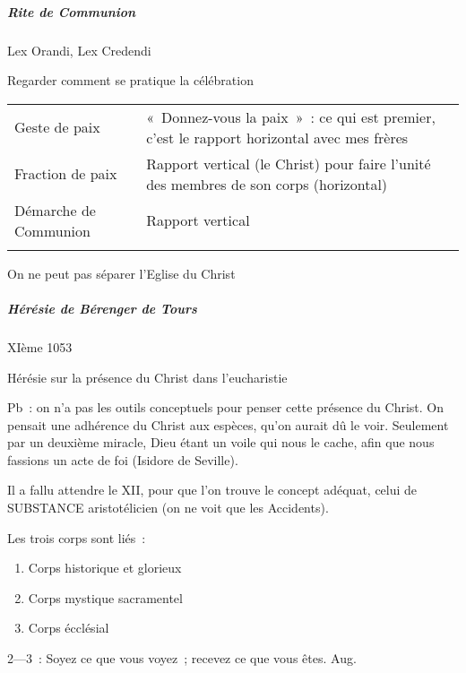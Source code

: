 \hypertarget{rite-de-communion}{%
\subparagraph{Rite de Communion}\label{rite-de-communion}}

Lex Orandi, Lex Credendi

Regarder comment se pratique la célébration

\begin{table}[h!]
    \centering
      \sidecaption{ }
 
\begin{tabular}{p{}p{}}
\toprule
Geste de paix & «~Donnez-vous la paix~»~: ce qui est premier, c'est le
rapport horizontal avec mes frères \\
Fraction de paix & Rapport vertical (le Christ) pour faire l'unité des
membres de son corps (horizontal) \\
Démarche de Communion & Rapport vertical \\
\\
\bottomrule
\end{tabular}
\label{tab:my_label}
\end{table}
 

On ne peut pas séparer l'Eglise du Christ

\hypertarget{huxe9ruxe9sie-de-buxe9renger-de-tours}{%
\subparagraph{Hérésie de Bérenger de
Tours}\label{huxe9ruxe9sie-de-buxe9renger-de-tours}}

XIème 1053

Hérésie sur la présence du Christ dans l'eucharistie

Pb~: on n'a pas les outils conceptuels pour penser cette présence du
Christ. On pensait une adhérence du Christ aux espèces, qu'on aurait dû
le voir. Seulement par un deuxième miracle, Dieu étant un voile qui nous
le cache, afin que nous fassions un acte de foi (Isidore de Seville).

Il a fallu attendre le XII, pour que l'on trouve le concept adéquat,
celui de SUBSTANCE aristotélicien (on ne voit que les Accidents).

Les trois corps sont liés~:

\begin{enumerate}
\def\labelenumi{\arabic{enumi}.}
\item
  Corps historique et glorieux
\item
  Corps mystique sacramentel
\item
  Corps écclésial
\end{enumerate}

2---3~: Soyez ce que vous voyez~; recevez ce que vous êtes. Aug.

